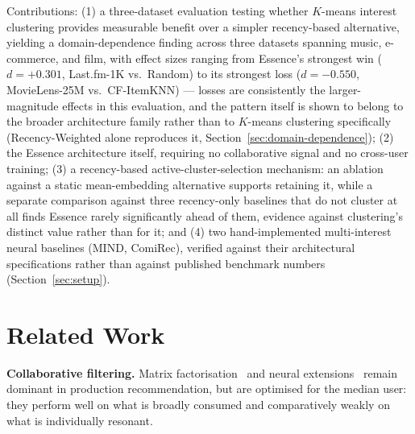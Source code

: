 \documentclass{article}
\begin{document}
Contributions: (1) a three-dataset evaluation testing whether $K$-means interest clustering provides measurable benefit over a simpler recency-based alternative, yielding a domain-dependence finding across three datasets spanning music, e-commerce, and film, with effect sizes ranging from Essence's strongest win ($d=+0.301$, Last.fm-1K vs.\ Random) to its strongest loss ($d=-0.550$, MovieLens-25M vs.\ CF-ItemKNN) --- losses are consistently the larger-magnitude effects in this evaluation, and the pattern itself is shown to belong to the broader architecture family rather than to $K$-means clustering specifically (Recency-Weighted alone reproduces it, Section~\ref{sec:domain-dependence}); (2) the Essence architecture itself, requiring no collaborative signal and no cross-user training; (3) a recency-based active-cluster-selection mechanism: an ablation against a static mean-embedding alternative supports retaining it, while a separate comparison against three recency-only baselines that do not cluster at all finds Essence rarely significantly ahead of them, evidence against clustering's distinct value rather than for it; and (4) two hand-implemented multi-interest neural baselines (MIND, ComiRec), verified against their architectural specifications rather than against published benchmark numbers (Section~\ref{sec:setup}).

\section{Related Work}
\label{sec:related}

\textbf{Collaborative filtering.} Matrix factorisation~\cite{koren2009} and neural extensions~\cite{he2017} remain dominant in production recommendation, but are optimised for the median user: they perform well on what is broadly consumed and comparatively weakly on what is individually resonant.
\end{document}
